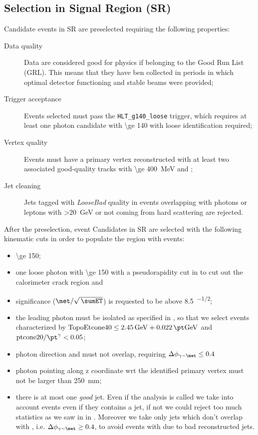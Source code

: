 \subsection{Selection in Signal Region (SR)}
Candidate events in SR are preselected requiring the following properties:
\begin{description}
\item [Data quality] Data are considered good for physics if belonging to the Good Run List (GRL). This means that they have ben collected in periods in which optimal detector functioning and stable beams were provided;
\item [Trigger acceptance] Events selected must pass the  \verb!HLT_g140_loose! trigger, which requires at least one photon candidate with \pt \SI{\ge 140}{\gev} with loose identification required;
\item [Vertex quality] Events must have a primary vertex reconstructed with at least two associated good-quality tracks with \pt \SI{\ge 400}{\MeV} and ;
\item [Jet cleaning] Jets tagged with {\itshape LooseBad} quality  in events overlapping with photons or leptons with \pt \SI{>20}{\GeV} or not coming from hard scattering are rejected.
\end{description}

After the preselection, event Candidates in SR are selected with the following kinematic cuts in order to populate the region with \gmet events:
\begin{itemize}
\item \met \SI{\ge 150}{\gev};
\item one loose photon with \pt \SI{\ge 150}{\gev} with a pseudorapidity cut in  to cut out the calorimeter crack region and 
\item \met significance ($\met/\sqrt{\,\sumET}$) is requested to be above \SI{8.5}{\gev^{-1/2}};
\item the leading photon must be isolated as specified in \Sect{\ref{sec:phisolation}}, so that we select events characterized by $ \text{TopoEtcone40} \le \SI{2.45}{\GeV} + \SI{0.022}{\pt\GeV}$ and $\text{ptcone20}/\pt^\gamma<0.05$;
\item photon direction and \met must not overlap, requiring $\Delta\phi_{\gamma - \met} \le 0.4$
\item photon pointing along z coordinate wrt the identified primary vertex must not be larger than \SI{250}{\mm};
\item there is at most one {\itshape good} jet. Even if the analysis is called \mph we take into account events even if they contains a jet, if not we could reject too much statistics as we saw in \Sect{\ref{sec:truth}} in \Fig{\ref{fig:validation}}. Moreover we take only jets which don't overlap with \met, i.e. $\Delta\phi_{\gamma -\met} \ge 0.4$, to avoid events with \met due to bad reconstructed jets.

\end{itemize}

